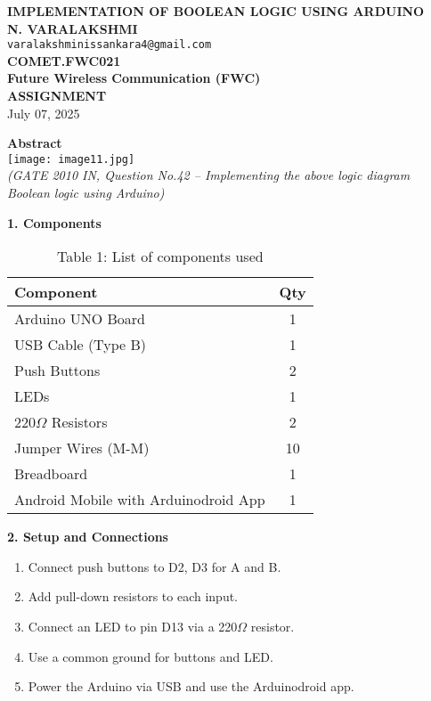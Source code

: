 \documentclass[12pt]{article}
\begin{document}
\begin{center}
    \textbf{\Large IMPLEMENTATION OF BOOLEAN LOGIC USING ARDUINO} \\[10pt]
    \textbf{N. VARALAKSHMI} \\
    \texttt{varalakshminissankara4@gmail.com} \\
    \textbf{COMET.FWC021} \\
    \textbf{Future Wireless Communication (FWC)} \\
    \textbf{ASSIGNMENT} \\[5pt]
    July 07, 2025
\end{center}
\vspace{1em}

\begin{multicols}{2}

\noindent\textbf{Abstract} \\[0.5em]
\texttt{[image: image11.jpg]} \\[0.5em]
\textit{(GATE 2010 IN, Question No.42 – Implementing the above logic diagram Boolean logic using Arduino)}

\vspace{1em}
\noindent\textbf{1. Components}
\begin{table}[H]
\small
\centering
\begin{tabular}{|p{4.2cm}|c|}
\hline
\textbf{Component} & \textbf{Qty} \\
\hline
Arduino UNO Board & 1 \\
USB Cable (Type B) & 1 \\
Push Buttons & 2 \\
LEDs & 1 \\
220$\Omega$ Resistors & 2 \\
Jumper Wires (M-M) & 10 \\
Breadboard & 1 \\
Android Mobile with Arduinodroid App & 1 \\
\hline
\end{tabular}
\caption*{Table 1: List of components used}
\end{table}

\vspace{1em}
\noindent\textbf{2. Setup and Connections}
\begin{enumerate}
    \item Connect push buttons to D2, D3 for A and B.
    \item Add pull-down resistors to each input.
    \item Connect an LED to pin D13 via a 220$\Omega$ resistor.
    \item Use a common ground for buttons and LED.
    \item Power the Arduino via USB and use the Arduinodroid app.
\end{enumerate}


\end{multicols}
\end{document}
